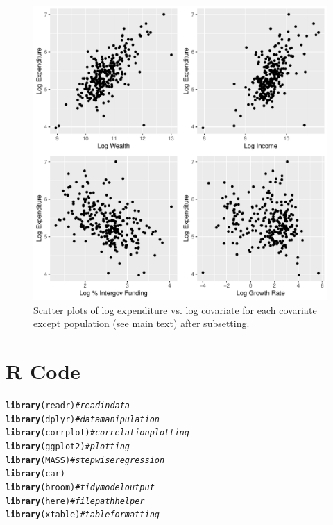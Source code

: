 \documentclass{article}\usepackage[]{graphicx}\usepackage[]{color}
\makeatletter
\def\maxwidth{ %
  \ifdim\Gin@nat@width>\linewidth
    \linewidth
  \else
    \Gin@nat@width
  \fi
}
\newcommand{\hlcom}[1]{\textcolor[rgb]{0.678,0.584,0.686}{\textit{#1}}}%
\newcommand{\hlstd}[1]{\textcolor[rgb]{0.345,0.345,0.345}{#1}}%
\newcommand{\hlkwd}[1]{\textcolor[rgb]{0.737,0.353,0.396}{\textbf{#1}}}%
\newenvironment{kframe}{%
 \def\at@end@of@kframe{}%
 \ifinner\ifhmode%
  \def\at@end@of@kframe{\end{minipage}}%
  \begin{minipage}{\columnwidth}%
 \fi\fi%
 \def\FrameCommand##1{\hskip\@totalleftmargin \hskip-\fboxsep
 \colorbox{shadecolor}{##1}\hskip-\fboxsep
     \hskip-\linewidth \hskip-\@totalleftmargin \hskip\columnwidth}%
 \MakeFramed {\advance\hsize-\width
   \@totalleftmargin\z@ \linewidth\hsize
   \@setminipage}}%
 {\par\unskip\endMakeFramed%
 \at@end@of@kframe}
\newenvironment{knitrout}{}{} %
\makeatother
\begin{document}
\begin{appendices}
\begin{knitrout}
\color{fgcolor}\begin{figure}
\includegraphics[width=\maxwidth]{figure/r_append_scatter_subset-1} \caption[Scatter plots of log expenditure vs]{Scatter plots of log expenditure vs. log covariate for each covariate except population (see main text) after subsetting.}\label{fig:r append_scatter_subset}
\end{figure}


\end{knitrout}




\newpage
\section{R Code}
\begin{knitrout}
\color{fgcolor}\begin{kframe}
\begin{alltt}
\hlkwd{library}\hlstd{(readr)} \hlcom{# read in data}
\hlkwd{library}\hlstd{(dplyr)} \hlcom{# data manipulation}
\hlkwd{library}\hlstd{(corrplot)} \hlcom{# correlation plotting}
\hlkwd{library}\hlstd{(ggplot2)} \hlcom{# plotting}
\hlkwd{library}\hlstd{(MASS)} \hlcom{# stepwise regression}
\hlkwd{library}\hlstd{(car)}
\hlkwd{library}\hlstd{(broom)} \hlcom{# tidy model output}
\hlkwd{library}\hlstd{(here)} \hlcom{# file path helper}
\hlkwd{library}\hlstd{(xtable)} \hlcom{# table formatting}


\end{alltt}
\end{kframe}
\end{knitrout}
\end{appendices}
\end{document}
